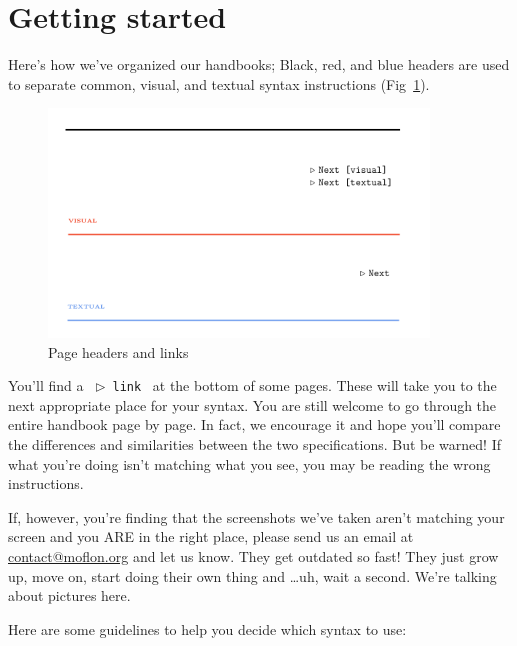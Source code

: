 \section{Getting started}
\genHeader 

Here's how we've organized our handbooks; Black, red, and blue headers are used to separate common, visual, and textual syntax instructions
(Fig~\ref{pageExamples}).

\begin{figure}[htbp] \centering
  \includegraphics[width=0.9\textwidth]{headers}
	\caption{Page headers and links}
	\label{pageExamples}
\end{figure}

You'll find a \mbox{ $\triangleright$ {\texttt{link}} } at the bottom of some pages. These will take you to the next appropriate place for your syntax. You are
still welcome to go through the entire handbook page by page. In fact, we encourage it and hope you'll compare the differences and similarities between the two
specifications. But be warned! If what you're doing isn't matching what you see, you may be reading the wrong instructions.

If, however, you're finding that the screenshots we've taken aren't matching your screen and you ARE in the right place, please send us an email at
\href{mailto:contact@moflon.org}{contact@moflon.org} and let us know. They get outdated so fast! They just grow up, move on, start doing their own thing and
\ldots uh, wait a second. We're talking about pictures here.

Here are some guidelines to help you decide which syntax to use:

